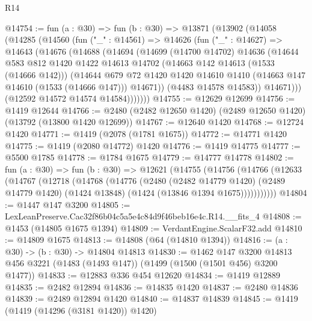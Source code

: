 \begin{lexlean}{R14}
\begin{coremodule}
@14754 := fun (a : @30) =>
  fun (b : @30) =>
  @13871
    (@13902
      (@14058
        (@14285
          (@14560
            (fun ("_" : @14561) =>
            @14626
              (fun ("_" : @14627) =>
              @14643
                (@14676
                  (@14688
                    (@14694
                      (@14699
                        (@14700 @14702)
                        @14636
                        (@14644
                          @583
                          @812
                          @1420
                          @1422
                          @14613
                          @14702
                          (@14663 @142 @14613 (@1533 (@14666 @142)))
                          (@14644
                            @679
                            @72
                            @1420
                            @1420
                            @14610
                            @1410
                            (@14663 @147 @14610 (@1533 (@14666 @147)))
                            @14671))
                        (@4483 @14578 @14583))
                      @14671)))
                (@12592 @14572 @14574 @14584)))))))
@14755 := @12629 @12699
@14756 := @1419 @12644
@14766 := @2480 (@2482 @12650 @1420) (@2489 @12650 @1420) (@13792 (@13800 @1420 @12699))
@14767 := @12640 @1420
@14768 := @12724 @1420
@14771 := @1419 (@2078 (@1781 @1675))
@14772 := @14771 @1420
@14775 := @1419 (@2080 @14772) @1420
@14776 := @1419 @14775
@14777 := @5500 @1785
@14778 := @1784 @1675
@14779 := @14777 @14778
@14802 := fun (a : @30) =>
  fun (b : @30) =>
  @12621
    (@14755
      (@14756
        (@14766
          (@12633
            (@14767
              (@12718
                (@14768
                  (@14776
                    (@2480
                      (@2482 @14779 @1420)
                      (@2489 @14779 @1420)
                      (@1424 @13848)
                      (@1424 (@13846 @1394 @1675)))))))))))
@14804 := @1447 @147 @3200
@14805 := LexLeanPreserve.Cac32f86b04c5a5e4c84d9f46beb16e4c.R14.__fits_4
@14808 := @1453 (@14805 @1675 @1394)
@14809 := VerdantEngine.ScalarF32.add
@14810 := @14809 @1675
@14813 := @14808 (@64 (@14810 @1394))
@14816 := (a : @30) -> (b : @30) -> @14804 @14813
@14830 := @1462
    @147
    @3200
    @14813
    @456
    @3221
    (@1483 (@1493 @147))
    (@1499 (@1500 (@1501 @456) @3200 @1477))
@14833 := @12883 @336 @454 @12620
@14834 := @1419 @12889
@14835 := @2482 @12894
@14836 := @14835 @1420
@14837 := @2480 @14836
@14839 := @2489 @12894 @1420
@14840 := @14837 @14839
@14845 := @1419 (@1419 (@14296 (@3181 @1420)) @1420)

\end{coremodule}
\end{lexlean}
